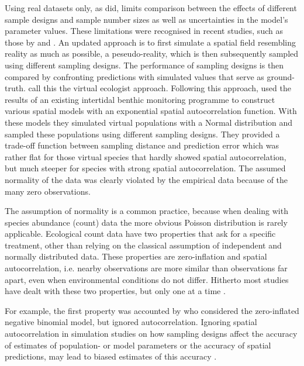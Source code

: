 \documentclass[review]{elsarticle}
\begin{document}
Using real datasets only, as \citet{fortin1989} did, limits comparison between the effects of different sample designs and sample number sizes as well as uncertainties in the model's parameter values. These limitations were recognised in recent studies, such as those  by \citet{perner2004, rachowicz2006, bijleveld2012} and \citet{foster2014}. 
An updated approach is to first simulate a spatial field resembling reality as much as possible, a peseudo-reality, which is then subsequently sampled using different sampling designs. The performance of sampling designs is then compared by confronting predictions with simulated values that serve as ground-truth.  \citet{zurell2010} call this the virtual ecologist approach.  Following this approach, \citet{bijleveld2012} used the results of an existing intertidal benthic monitoring programme to construct various spatial models with an exponential spatial autocorrelation function. With these models they simulated virtual populations with a Normal distribution and sampled these populations using different sampling designs. They provided a trade-off function between sampling distance and prediction error which was rather flat for those virtual species that hardly showed spatial autocorrelation, but much steeper for species with strong spatial autocorrelation. The assumed normality of the data was clearly violated by the empirical data because of the many zero observations.

The assumption of normality is a common practice, because when dealing with species abundance (count) data the more obvious Poisson distribution is rarely applicable. Ecological count data have two properties that ask for a specific treatment, other than relying on the classical assumption of independent and normally distributed data. These properties are zero-inflation \citep{martin2005, clarke1988, lewis2011} and spatial autocorrelation, i.e. nearby observations are more similar than observations far apart, even when environmental conditions do not differ. Hitherto most studies have dealt with these two properties, but only one at a time \citep{tyre2003, bijleveld2012}.

For example, the first property was accounted by \citet{tyre2003} who considered the zero-inflated negative binomial model, but ignored autocorrelation. Ignoring spatial autocorrelation in simulation studies on how sampling designs affect the accuracy of estimates of population- or model parameters or the accuracy of spatial predictions, may lead to biased estimates of this accuracy \citep{legendre2002}.
\end{document}

